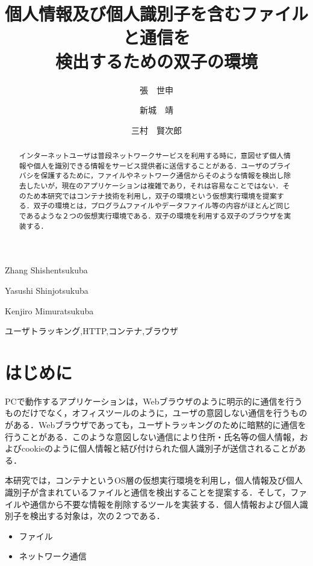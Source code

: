 \documentclass[submit,techrep]{ipsj}
\begin{document}
\title{個人情報及び個人識別子を含むファイルと通信を\\
検出するための双子の環境}




\author{張　世申}{Zhang Shishen}{tsukuba}
\author{新城　靖}{Yasushi Shinjo}{tsukuba}
\author{三村　賢次郎}{Kenjiro Mimura}{tsukuba}


\begin{abstract}
インターネットユーザは普段ネットワークサービスを利用する時に，意図せず個人情報や個人を識別できる情報をサービス提供者に送信することがある．ユーザのプライバシを保護するために，ファイルやネットワーク通信からそのような情報を検出し除去したいが，現在のアプリケーションは複雑であり，それは容易なことではない．そのため本研究ではコンテナ技術を利用し，双子の環境という仮想実行環境を提案する．双子の環境とは，プログラムファイルやデータファイル等の内容がほとんど同じであるような２つの仮想実行環境である．双子の環境を利用する双子のブラウザを実装する．
\end{abstract}


\begin{jkeyword}
ユーザトラッキング,HTTP,コンテナ,ブラウザ
\end{jkeyword}



\maketitle


\section{はじめに}
PCで動作するアプリケーションは，Webブラウザのように明示的に通信を行うものだけでなく，オフィスツールのように，ユーザの意図しない通信を行うものがある．Webブラウザであっても，ユーザトラッキングのために暗黙的に通信を行うことがある．このような意図しない通信により住所・氏名等の個人情報，およびcookieのように個人情報と結び付けられた個人識別子が送信されることがある．

本研究では，コンテナというOS層の仮想実行環境を利用し，個人情報及び個人識別子が含まれているファイルと通信を検出することを提案する．そして，ファイルや通信から不要な情報を削除するツールを実装する．個人情報および個人識別子を検出する対象は，次の２つである．
\begin{itemize}
\item
ファイル
\item
ネットワーク通信 
\end{itemize}
\end{document}
